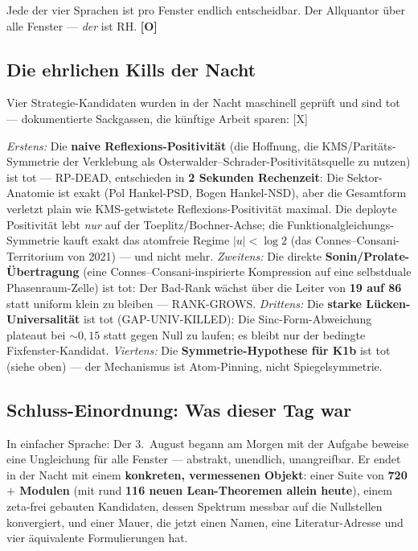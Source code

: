 \documentclass[11pt,a4paper]{article}
\newcommand{\OO}{\textcolor{offen}{\textbf{[O]}}}
\begin{document}
Jede der vier Sprachen ist pro Fenster endlich entscheidbar. Der
Allquantor über alle Fenster --- \emph{der} ist RH. \OO{}

\subsection{Die ehrlichen Kills der Nacht}

Vier Strategie-Kandidaten wurden in der Nacht maschinell geprüft
und sind tot --- dokumentierte Sackgassen, die künftige Arbeit
sparen: [X]

\emph{Erstens:} Die \textbf{naive Reflexions-Positivität} (die
Hoffnung, die KMS/Paritäts-Symmetrie der Verklebung als
Osterwalder--Schrader-Positivitätsquelle zu nutzen) ist tot ---
RP-DEAD, entschieden in \textbf{2 Sekunden Rechenzeit}: Die
Sektor-Anatomie ist exakt (Pol Hankel-PSD, Bogen Hankel-NSD), aber
die Gesamtform verletzt plain wie KMS-getwistete
Reflexions-Positivität maximal. Die deployte Positivität lebt
\emph{nur} auf der Toeplitz/Bochner-Achse; die
Funktionalgleichungs-Symmetrie kauft exakt das atomfreie Regime
$|u| < \log 2$ (das Connes--Consani-Territorium von 2021) --- und
nicht mehr. \emph{Zweitens:} Die direkte
\textbf{Sonin/Prolate-Übertragung} (eine Connes--Consani-inspirierte
Kompression auf eine selbstduale Phasenraum-Zelle) ist tot: Der
Bad-Rank wächst über die Leiter von \textbf{19 auf 86} statt
uniform klein zu bleiben --- RANK-GROWS. \emph{Drittens:} Die
\textbf{starke Lücken-Universalität} ist tot (GAP-UNIV-KILLED):
Die Sinc-Form-Abweichung plateaut bei $\sim 0{,}15$ statt gegen
Null zu laufen; es bleibt nur der bedingte Fixfenster-Kandidat.
\emph{Viertens:} Die \textbf{Symmetrie-Hypothese für K1b} ist tot
(siehe oben) --- der Mechanismus ist Atom-Pinning, nicht
Spiegelsymmetrie.

\subsection{Schluss-Einordnung: Was dieser Tag war}

In einfacher Sprache: Der 3.~August begann am Morgen mit der
Aufgabe \glqq{}beweise eine Ungleichung für alle Fenster\grqq{} ---
abstrakt, unendlich, unangreifbar. Er endet in der Nacht mit einem
\textbf{konkreten, vermessenen Objekt}: einer Suite von
\textbf{720$+$ Modulen} (mit rund \textbf{116 neuen Lean-Theoremen
allein heute}), einem zeta-frei gebauten Kandidaten, dessen
Spektrum messbar auf die Nullstellen konvergiert, und einer Mauer,
die jetzt einen Namen, eine Literatur-Adresse und vier äquivalente
Formulierungen hat.
\end{document}
